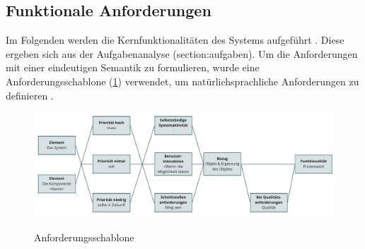 \subsection*{Funktionale Anforderungen}
\label{section:funktionale}
Im Folgenden werden die Kernfunktionalitäten des Systems aufgeführt \cite{balzert2009}.
Diese ergeben sich aus der Aufgabenanalyse (section:aufgaben). Um die Anforderungen mit einer eindeutigen Semantik zu formulieren, wurde eine Anforderungsschablone (\ref{fig:schablone}) verwendet, um natürlichsprachliche Anforderungen zu definieren \cite{balzert2009}.

\begin{figure}[h]
        \centering
        \includegraphics[scale=0.45]{Bilder/anforderungsschablone.pdf}
        \label{fig:schablone}
    \caption[Anforderungsschablone]{Anforderungsschablone \cite{balzert2009}}
\end{figure}

